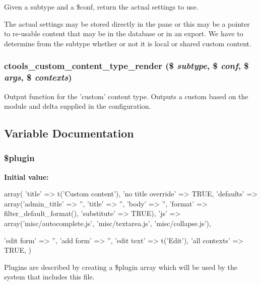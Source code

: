 \label{custom_8inc_ae59d8ddc790a2cf617a5258605558afe}
Given a subtype and a \$conf, return the actual settings to use.

The actual settings may be stored directly in the pane or this may be a pointer to re-\/usable content that may be in the database or in an export. We have to determine from the subtype whether or not it is local or shared custom content. \hypertarget{custom_8inc_ac0fef2187c02bdc6637f6dc04aebba7e}{
\subsubsection[{ctools\_\-custom\_\-content\_\-type\_\-render}]{\setlength{\rightskip}{0pt plus 5cm}ctools\_\-custom\_\-content\_\-type\_\-render (\$ {\em subtype}, \/  \$ {\em conf}, \/  \$ {\em args}, \/  \$ {\em contexts})}}
\label{custom_8inc_ac0fef2187c02bdc6637f6dc04aebba7e}
Output function for the 'custom' content type. Outputs a custom based on the module and delta supplied in the configuration. 

\subsection{Variable Documentation}
\hypertarget{custom_8inc_ada8a7130088351710bb02ed622d6bf65}{
\subsubsection[{\$plugin}]{\setlength{\rightskip}{0pt plus 5cm}\$plugin}}
\label{custom_8inc_ada8a7130088351710bb02ed622d6bf65}
{\bfseries Initial value:}
\begin{DoxyCode}
 array(
  'title' => t('Custom content'),
  'no title override' => TRUE,
  'defaults' => array('admin_title' => '', 'title' => '', 'body' => '', 'format' 
      => filter_default_format(), 'substitute' => TRUE),
  'js' => array('misc/autocomplete.js', 'misc/textarea.js', 'misc/collapse.js'),
  
  'edit form' => '',
  'add form' => '',
  'edit text' => t('Edit'),
  'all contexts' => TRUE,
)
\end{DoxyCode}
Plugins are described by creating a \$plugin array which will be used by the system that includes this file. 